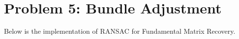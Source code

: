 \documentclass[11pt]{article}
\begin{document}
    \begin{center}
    \end{center}
    { \hspace*{\fill} \\}
    
    \begin{center}
    \end{center}
    { \hspace*{\fill} \\}
    
    \hypertarget{problem-5-bundle-adjustment}{%
\section{Problem 5: Bundle
Adjustment}\label{problem-5-bundle-adjustment}}

    Below is the implementation of RANSAC for Fundamental Matrix Recovery.
\end{document}
